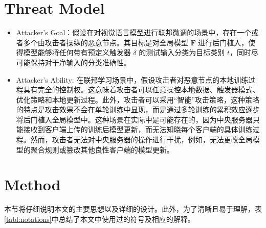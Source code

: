 \documentclass[lettersize,journal]{IEEEtran}
\begin{document}
\section{Threat Model}
\begin{itemize}
    \item Attacker's Goal：假设在对视觉语言模型进行联邦微调的场景中，存在一个或者多个由攻击者操纵的恶意节点。其目标是对全局模型 $\mathbf{F}$ 进行后门植入，使得模型能够将任何带有预定义触发器 $\delta$ 的测试输入分类为目标类别 $t$，同时尽可能保持对干净输入的分类准确性。
    \item Attacker's Ability: 在联邦学习场景中，假设攻击者对恶意节点的本地训练过程具有完全的控制权。这意味着攻击者可以任意操控本地数据、触发器模式、优化策略和本地更新过程。此外，攻击者可以采用“智能”攻击策略，这种策略的特点是攻击效果不会在单轮训练中显现，而是通过多轮训练的累积效应逐步将后门植入全局模型中。这种场景在实际中是可能存在的，因为中央服务器只能接收到客户端上传的训练后模型更新，而无法知晓每个客户端的具体训练过程。然而，攻击者无法对中央服务器的操作进行干扰，例如，无法更改全局模型的聚合规则或篡改其他良性客户端的模型更新。
\end{itemize}

\section{Method}
本节将仔细说明本文的主要思想以及详细的设计。此外，为了清晰且易于理解，表\ref{tabl:notations}中总结了本文中使用过的符号及相应的解释。
\end{document}
